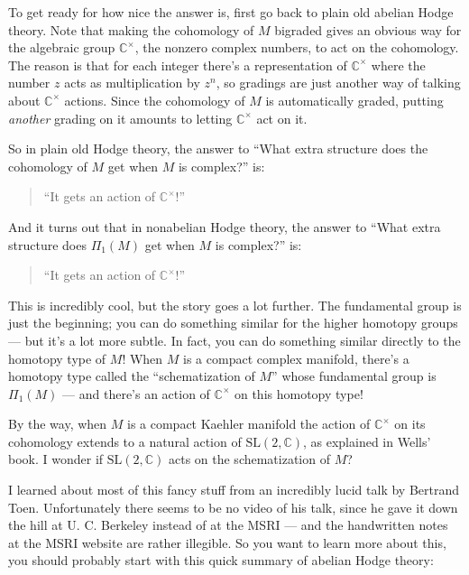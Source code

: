\documentclass{article}
\begin{document}
To get ready for how nice the answer is, first go back to plain old
abelian Hodge theory. Note that making the cohomology of \(M\) bigraded
gives an obvious way for the algebraic group \(\mathbb{C}^\times\), the
nonzero complex numbers, to act on the cohomology. The reason is that
for each integer there's a representation of \(\mathbb{C}^\times\) where
the number \(z\) acts as multiplication by \(z^n\), so gradings are just
another way of talking about \(\mathbb{C}^\times\) actions. Since the
cohomology of \(M\) is automatically graded, putting \emph{another}
grading on it amounts to letting \(\mathbb{C}^\times\) act on it.

So in plain old Hodge theory, the answer to ``What extra structure does
the cohomology of \(M\) get when \(M\) is complex?'' is:

\begin{quote}
``It gets an action of \(\mathbb{C}^\times\)!''
\end{quote}

And it turns out that in nonabelian Hodge theory, the answer to ``What
extra structure does \(\Pi_1(M)\) get when \(M\) is complex?'' is:

\begin{quote}
``It gets an action of \(\mathbb{C}^\times\)!''
\end{quote}

This is incredibly cool, but the story goes a lot further. The
fundamental group is just the beginning; you can do something similar
for the higher homotopy groups --- but it's a lot more subtle. In fact,
you can do something similar directly to the homotopy type of \(M\)!
When \(M\) is a compact complex manifold, there's a homotopy type called
the ``schematization of \(M\)'' whose fundamental group is \(\Pi_1(M)\)
--- and there's an action of \(\mathbb{C}^\times\) on this homotopy
type!

By the way, when \(M\) is a compact Kaehler manifold the action of
\(\mathbb{C}^\times\) on its cohomology extends to a natural action of
\(\mathrm{SL}(2,\mathbb{C})\), as explained in Wells' book. I wonder if
\(\mathrm{SL}(2,\mathbb{C})\) acts on the schematization of \(M\)?

I learned about most of this fancy stuff from an incredibly lucid talk
by Bertrand Toen. Unfortunately there seems to be no video of his talk,
since he gave it down the hill at U. C. Berkeley instead of at the MSRI
--- and the handwritten notes at the MSRI website are rather illegible.
So you want to learn more about this, you should probably start with
this quick summary of abelian Hodge theory:
\end{document}
